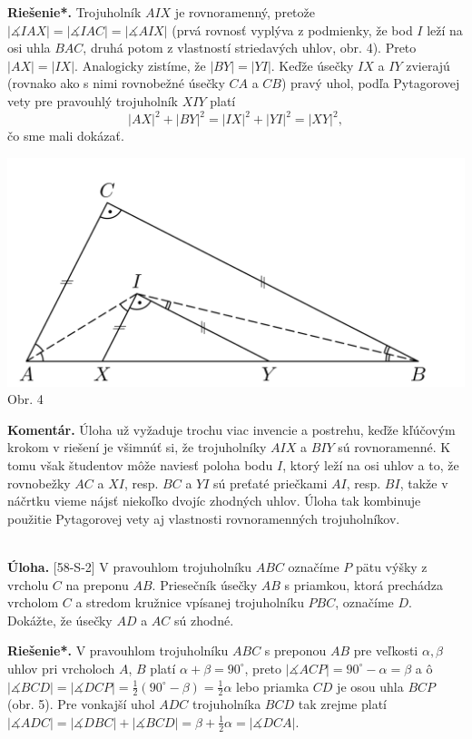 \documentclass[11pt,a4paper,oneside,final]{book}
\newcommand{\kom}{\textbf{Komentár.} }
\newcommand{\ul}{\textbf{Úloha.} }
\newcommand{\rieh}{\textbf{Riešenie*.} }
\newcommand{\ma}{\measuredangle}
\begin{document}
\rieh Trojuholník $AIX$ je rovnoramenný, pretože $|\ma IAX| = |\ma IAC| = | \ma AIX|$ (prvá rovnosť vyplýva z podmienky, že bod $I$ leží na osi uhla $BAC$, druhá potom z vlastností striedavých uhlov, obr. 4). Preto $|AX| = |IX|$. Analogicky zistíme, že $|BY | = |Y I|$. Keďže úsečky $IX$ a $IY$ zvierajú (rovnako ako s nimi rovnobežné úsečky $CA$ a $CB$) pravý uhol, podľa Pytagorovej vety pre pravouhlý trojuholník $XIY$ platí $$|AX|^2+ |BY |^2= |IX|^2+ |Y I|^2= |XY |^2,$$
čo sme mali dokázať.
\begin{center}
\includegraphics[scale=0.3]{63S3}\\

Obr. 4
\end{center}
\kom Úloha už vyžaduje trochu viac invencie a postrehu, keďže kľúčovým krokom v riešení je všimnúť si, že trojuholníky $AIX$ a $BIY$ sú rovnoramenné. K tomu však študentov môže naviesť poloha bodu $I$, ktorý leží na osi uhlov a to, že rovnobežky $AC$ a $XI$, resp. $BC$ a $YI$ sú preťaté priečkami $AI$, resp. $BI$, takže v náčrtku vieme nájsť niekoľko dvojíc zhodných uhlov. Úloha tak kombinuje použitie Pytagorovej vety aj vlastnosti rovnoramenných trojuholníkov.\\
\\
\begin{tcolorbox}[breakable,notitle,boxrule=0pt,colback=light-gray,colframe=light-gray]\ul [58-S-2]
 V pravouhlom trojuholníku $ABC$ označíme $P$ pätu výšky z vrcholu $C$ na preponu $AB$. Priesečník úsečky $AB$ s priamkou, ktorá prechádza vrcholom $C$ a stredom kružnice vpísanej trojuholníku $PBC$, označíme $D$. Dokážte, že úsečky $AD$ a $AC$ sú zhodné.

\end{tcolorbox}

\rieh V pravouhlom trojuholníku $ABC$ s preponou $AB$ pre veľkosti $\alpha, \beta$ uhlov pri vrcholoch $A$, $B$ platí $\alpha+\beta= 90^\circ$, preto $|\ma ACP| = 90^\circ -\alpha = \beta$ a ô$|\ma BCD| = | \ma DCP|= \frac{1}{2}(90^\circ -\beta) = \frac{1}{2}\alpha$ lebo priamka $CD$ je osou uhla $BCP$ (obr. 5). Pre vonkajší uhol $ADC$ trojuholníka $BCD$ tak zrejme platí $|\ma ADC| = |\ma DBC| + |\ma BCD| = \beta  +\frac{1}{2}\alpha = |\ma DCA|.$
\end{document}
